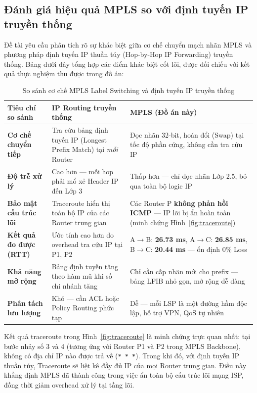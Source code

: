 \subsection{Đánh giá hiệu quả MPLS so với định tuyến IP truyền thống}

Đề tài yêu cầu phân tích rõ sự khác biệt giữa cơ chế chuyển mạch nhãn MPLS và phương pháp định tuyến IP thuần túy (Hop-by-Hop IP Forwarding) truyền thống. Bảng dưới đây tổng hợp các điểm khác biệt cốt lõi, được đối chiếu với kết quả thực nghiệm thu được trong đồ án:

\begin{table}[H]
    \centering
    \begin{tabular}{|p{4cm}|>{\centering\arraybackslash}p{5cm}|>{\centering\arraybackslash}p{5cm}|}
    \hline
    \rowcolor[HTML]{2C3E50}
    \color{white} \textbf{Tiêu chí so sánh} & \color{white} \textbf{IP Routing truyền thống} & \color{white} \textbf{MPLS (Đồ án này)} \\ \hline
    \textbf{Cơ chế chuyển tiếp} & Tra cứu bảng định tuyến IP (Longest Prefix Match) tại \textit{mỗi} Router & Đọc nhãn 32-bit, hoán đổi (Swap) tại tốc độ phần cứng, không cần tra cứu IP \\ \hline
    \textbf{Độ trễ xử lý} & Cao hơn — mỗi hop phải mổ xẻ Header IP đến Lớp 3 & Thấp hơn — chỉ đọc nhãn Lớp 2.5, bỏ qua toàn bộ logic IP \\ \hline
    \textbf{Bảo mật cấu trúc lõi} & Traceroute hiển thị toàn bộ IP của các Router trung gian & Các Router P \textbf{không phản hồi ICMP} — IP lõi bị ẩn hoàn toàn (minh chứng Hình~\ref{fig:traceroute}) \\ \hline
    \textbf{Kết quả đo được (RTT)} & Ước tính cao hơn do overhead tra cứu IP tại P1, P2 & A$\to$B: \textbf{26.73 ms}, A$\to$C: \textbf{26.85 ms}, B$\to$C: \textbf{20.44 ms} — ổn định 0\% Loss \\ \hline
    \textbf{Khả năng mở rộng} & Bảng định tuyến tăng theo hàm mũ khi số chi nhánh tăng & Chỉ cần cấp nhãn mới cho prefix — bảng LFIB nhỏ gọn, mở rộng dễ dàng \\ \hline
    \textbf{Phân tách lưu lượng} & Khó — cần ACL hoặc Policy Routing phức tạp & Dễ — mỗi LSP là một đường hầm độc lập, hỗ trợ VPN, QoS tự nhiên \\ \hline
    \end{tabular}
    \caption{So sánh cơ chế MPLS Label Switching và định tuyến IP truyền thống}
    \label{tab:mpls_vs_ip}
\end{table}

Kết quả traceroute trong Hình~\ref{fig:traceroute} là minh chứng trực quan nhất: tại bước nhảy số 3 và 4 (tương ứng với Router P1 và P2 trong MPLS Backbone), không có địa chỉ IP nào được trả về (\texttt{* * *}). Trong khi đó, với định tuyến IP thuần túy, Traceroute sẽ liệt kê đầy đủ IP của mọi Router trung gian. Điều này khẳng định MPLS đã thành công trong việc ẩn toàn bộ cấu trúc lõi mạng ISP, đồng thời giảm overhead xử lý tại tầng lõi.


